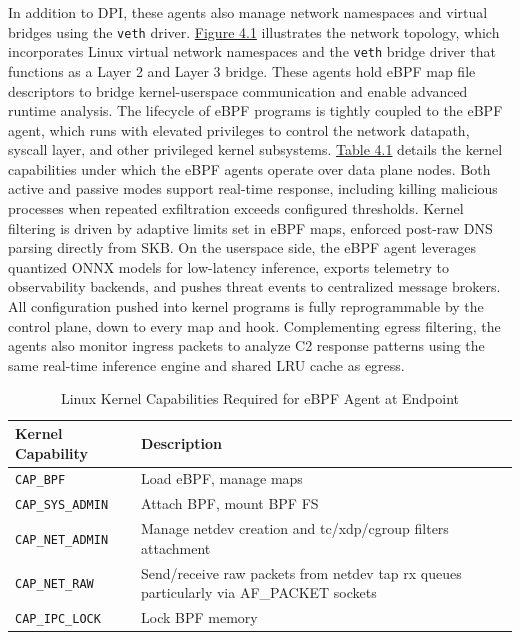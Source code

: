 \documentclass [11pt, proquest] {uwthesis}[2020/02/24]
\begin{document}
In addition to DPI, these agents also manage network namespaces and virtual bridges using the \texttt{veth} driver. \hyperref[sec:dp_eBPF_agent_net_topology]{Figure 4.1} illustrates the network topology, which incorporates Linux virtual network namespaces and the \texttt{veth} bridge driver that functions as a Layer 2 and Layer 3 bridge.
These agents hold eBPF map file descriptors to bridge kernel-userspace communication and enable advanced runtime analysis. The lifecycle of eBPF programs is tightly coupled to the eBPF agent, which runs with elevated privileges to control the network datapath, syscall layer, and other privileged kernel subsystems. \hyperref[sec:dp_kernel_cap]{Table 4.1} details the kernel capabilities under which the eBPF agents operate over data plane nodes. Both active and passive modes support real-time response, including killing malicious processes when repeated exfiltration exceeds configured thresholds. Kernel filtering is driven by adaptive limits set in eBPF maps, enforced post-raw DNS parsing directly from SKB. On the userspace side, the eBPF agent leverages quantized ONNX models for low-latency inference, exports telemetry to observability backends, and pushes threat events to centralized message brokers. All configuration pushed into kernel programs is fully reprogrammable by the control plane, down to every map and hook. Complementing egress filtering, the agents also monitor ingress packets to analyze C2 response patterns using the same real-time inference engine and shared LRU cache as egress.

\begin{table}[h]
\centering
\begin{tabular}{|l|p{10cm}|}
\hline
\textbf{Kernel Capability} & \textbf{Description} \\
\hline
\texttt{CAP\_BPF} & Load eBPF, manage maps \\
\hline
\texttt{CAP\_SYS\_ADMIN} & Attach BPF, mount BPF FS \\
\hline
\texttt{CAP\_NET\_ADMIN} & Manage netdev creation and tc/xdp/cgroup filters attachment \\
\hline
\texttt{CAP\_NET\_RAW} & Send/receive raw packets from netdev tap rx queues particularly via AF\_PACKET sockets  \\
\hline
\texttt{CAP\_IPC\_LOCK} & Lock BPF memory \\
\hline
\end{tabular}
\caption{Linux Kernel Capabilities Required for eBPF Agent at Endpoint}
\label{sec:dp_kernel_cap}
\end{table}
\end{document}
